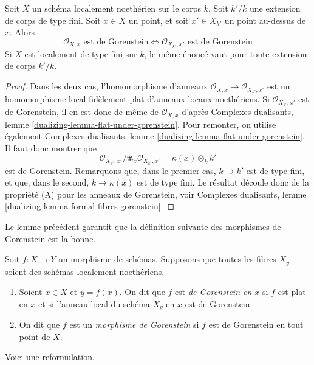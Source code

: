 \begin{lemma}
\label{lemma-gorenstein-base-change}
Soit $X$ un schéma localement noethérien sur le corps $k$. Soit $k'/k$ une extension de corps de type fini. Soit $x \in X$ un point, et soit $x' \in X_{k'}$ un point au-dessus de $x$. Alors
$$
\mathcal{O}_{X, x}\text{ est de Gorenstein}
\Leftrightarrow
\mathcal{O}_{X_{k'}, x'}\text{ est de Gorenstein}
$$
Si $X$ est localement de type fini sur $k$, le même énoncé vaut pour toute extension de corps $k'/k$.
\end{lemma}

\begin{proof}
Dans les deux cas, l'homomorphisme d'anneaux $\mathcal{O}_{X, x} \to \mathcal{O}_{X_{k'}, x'}$ est un homomorphisme local fidèlement plat d'anneaux locaux noethériens. Si $\mathcal{O}_{X_{k'}, x'}$ est de Gorenstein, il en est donc de même de $\mathcal{O}_{X, x}$ d'après Complexes dualisants, lemme \ref{dualizing-lemma-flat-under-gorenstein}. Pour remonter, on utilise également Complexes dualisants, lemme \ref{dualizing-lemma-flat-under-gorenstein}. Il faut donc montrer que
$$
\mathcal{O}_{X_{k'}, x'}/\mathfrak m_x \mathcal{O}_{X_{k'}, x'} =
\kappa(x) \otimes_k k'
$$
est de Gorenstein. Remarquons que, dans le premier cas, $k \to k'$ est de type fini, et que, dans le second, $k \to \kappa(x)$ est de type fini. Le résultat découle donc de la propriété (A) pour les anneaux de Gorenstein, voir Complexes dualisants, lemme \ref{dualizing-lemma-formal-fibres-gorenstein}.
\end{proof}

\noindent
Le lemme précédent garantit que la définition suivante des morphismes de Gorenstein est la bonne.

\begin{definition}
\label{definition-gorenstein-morphism}
Soit $f : X \to Y$ un morphisme de schémas. Supposons que toutes les fibres $X_y$ soient des schémas localement noethériens.
\begin{enumerate}
\item Soient $x \in X$ et $y = f(x)$. On dit que $f$ est {\it de Gorenstein en $x$} si $f$ est plat en $x$ et si l'anneau local du schéma $X_y$ en $x$ est de Gorenstein.
\item On dit que $f$ est un {\it morphisme de Gorenstein} si $f$ est de Gorenstein en tout point de $X$.
\end{enumerate}
\end{definition}

\noindent
Voici une reformulation.


